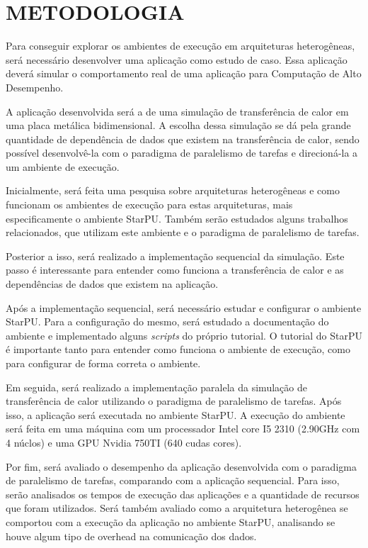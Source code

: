 
\chapter{METODOLOGIA}
\label{chap:metodologia}

Para conseguir explorar os ambientes de execução em arquiteturas heterogêneas, será necessário desenvolver uma aplicação como estudo de caso. Essa aplicação deverá simular o comportamento real de uma aplicação para Computação de Alto Desempenho. 

A aplicação desenvolvida será a de uma simulação de transferência de calor em uma placa metálica bidimensional. A escolha dessa simulação se dá pela grande quantidade de dependência de dados que existem na transferência de calor, sendo possível desenvolvê-la com o paradigma de paralelismo de tarefas e direcioná-la a um ambiente de execução.

Inicialmente, será feita uma pesquisa sobre arquiteturas heterogêneas e como funcionam os ambientes de execução para estas arquiteturas,
mais especificamente o ambiente StarPU.
Também serão estudados alguns trabalhos relacionados, que utilizam este ambiente e o paradigma de paralelismo de tarefas.

Posterior a isso, será realizado a implementação sequencial da simulação.
Este passo é interessante para entender como funciona a transferência de calor e as dependências de dados que existem na aplicação.

Após a implementação sequencial, será necessário estudar e configurar o ambiente StarPU. Para a configuração do mesmo,
será estudado a documentação do ambiente e implementado alguns \textit{scripts} do próprio tutorial.
O tutorial do StarPU é importante tanto para entender como funciona o ambiente de execução, como para configurar de forma correta o ambiente.

Em seguida, será realizado a implementação paralela da simulação de transferência de calor utilizando o paradigma de paralelismo de tarefas.
Após isso, a aplicação será executada no ambiente StarPU. 
A execução do ambiente será feita em uma máquina com um processador Intel core I5 2310 (2.90GHz com 4 núclos) e uma GPU Nvidia 750TI (640 cudas cores).

Por fim, será avaliado o desempenho da aplicação desenvolvida com o paradigma de paralelismo de tarefas, comparando com a aplicação sequencial. Para isso, serão analisados os tempos de execução das aplicações e a quantidade de recursos que foram utilizados.
Será também avaliado como a arquitetura heterogênea se comportou com a execução da aplicação no ambiente StarPU, analisando se houve algum tipo de overhead na comunicação dos dados.